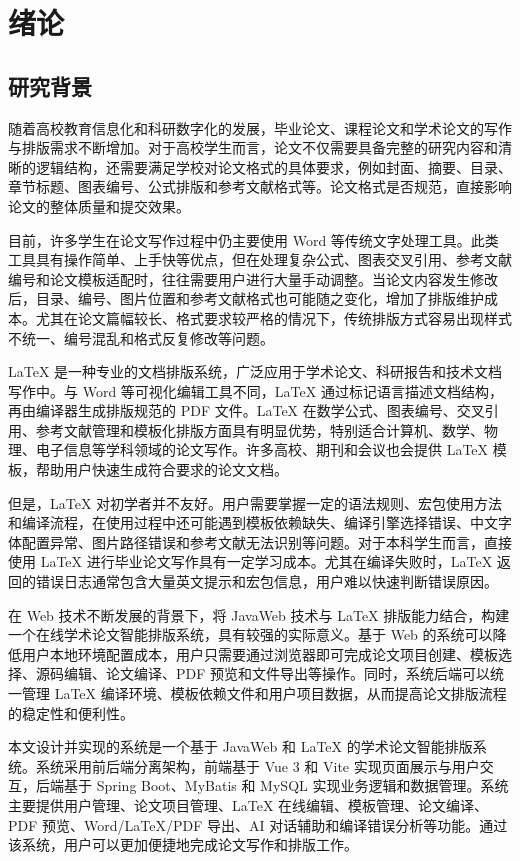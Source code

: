 \documentclass{xduugthesis}
\begin{document}
\chapter{绪论}

\section{研究背景}

随着高校教育信息化和科研数字化的发展，毕业论文、课程论文和学术论文的写作与排版需求不断增加。对于高校学生而言，论文不仅需要具备完整的研究内容和清晰的逻辑结构，还需要满足学校对论文格式的具体要求，例如封面、摘要、目录、章节标题、图表编号、公式排版和参考文献格式等。论文格式是否规范，直接影响论文的整体质量和提交效果。

目前，许多学生在论文写作过程中仍主要使用 Word 等传统文字处理工具。此类工具具有操作简单、上手快等优点，但在处理复杂公式、图表交叉引用、参考文献编号和论文模板适配时，往往需要用户进行大量手动调整\cite{gong2009automating}。当论文内容发生修改后，目录、编号、图片位置和参考文献格式也可能随之变化，增加了排版维护成本。尤其在论文篇幅较长、格式要求较严格的情况下，传统排版方式容易出现样式不统一、编号混乱和格式反复修改等问题。

LaTeX 是一种专业的文档排版系统，广泛应用于学术论文、科研报告和技术文档写作中\cite{zhou2022latex,lamport1994latex}。与 Word 等可视化编辑工具不同，LaTeX 通过标记语言描述文档结构，再由编译器生成排版规范的 PDF 文件。LaTeX 在数学公式、图表编号、交叉引用、参考文献管理和模板化排版方面具有明显优势，特别适合计算机、数学、物理、电子信息等学科领域的论文写作\cite{tan2023latex}。许多高校、期刊和会议也会提供 LaTeX 模板，帮助用户快速生成符合要求的论文文档。

但是，LaTeX 对初学者并不友好。用户需要掌握一定的语法规则、宏包使用方法和编译流程，在使用过程中还可能遇到模板依赖缺失、编译引擎选择错误、中文字体配置异常、图片路径错误和参考文献无法识别等问题\cite{wang2019latex}。对于本科学生而言，直接使用 LaTeX 进行毕业论文写作具有一定学习成本。尤其在编译失败时，LaTeX 返回的错误日志通常包含大量英文提示和宏包信息，用户难以快速判断错误原因。

在 Web 技术不断发展的背景下，将 JavaWeb 技术与 LaTeX 排版能力结合，构建一个在线学术论文智能排版系统，具有较强的实际意义\cite{li2025javaweb}。基于 Web 的系统可以降低用户本地环境配置成本，用户只需要通过浏览器即可完成论文项目创建、模板选择、源码编辑、论文编译、PDF 预览和文件导出等操作。同时，系统后端可以统一管理 LaTeX 编译环境、模板依赖文件和用户项目数据，从而提高论文排版流程的稳定性和便利性。

本文设计并实现的系统是一个基于 JavaWeb 和 LaTeX 的学术论文智能排版系统。系统采用前后端分离架构，前端基于 Vue 3 和 Vite 实现页面展示与用户交互，后端基于 Spring Boot、MyBatis 和 MySQL 实现业务逻辑和数据管理。系统主要提供用户管理、论文项目管理、LaTeX 在线编辑、模板管理、论文编译、PDF 预览、Word/LaTeX/PDF 导出、AI 对话辅助和编译错误分析等功能。通过该系统，用户可以更加便捷地完成论文写作和排版工作。
\end{document}
